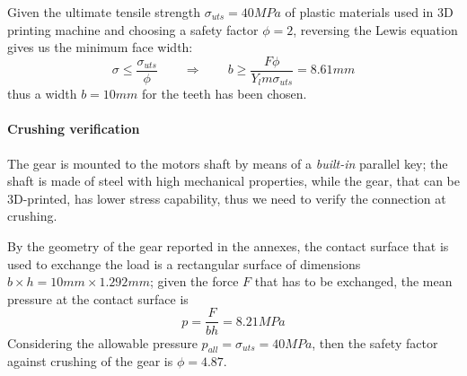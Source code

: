 	Given the ultimate tensile strength $\sigma_{uts} = 40MPa$ of plastic materials used in 3D printing machine and choosing a safety factor $\phi= 2$, reversing the Lewis equation gives us the minimum face width:
	\[ \sigma \leq \frac{\sigma_{uts}}{\phi} \qquad \Rightarrow \qquad b \geq \frac{F \phi}{Y_l m \sigma_{uts}} = 8.61mm \]
	thus a width $b = 10mm$ for the teeth has been chosen.
	
	\paragraph{Crushing verification} The gear is mounted to the motors shaft by means of a \textit{built-in} parallel key; the shaft is made of steel with high mechanical properties, while the gear, that can be 3D-printed, has lower stress capability, thus we need to verify the connection at crushing.
	
	By the geometry of the gear reported in the annexes, the contact surface that is used to exchange the load is a rectangular surface of dimensions $b\times h = 10 mm \times 1.292mm$; given the force $F$ that has to be exchanged, the mean pressure at the contact surface is
	\[ p = \frac{F}{bh} = 8.21MPa \]
	Considering the allowable pressure $p_{all} = \sigma_{uts} = 40MPa$, then the safety factor against crushing of the gear is $\phi = 4.87$.